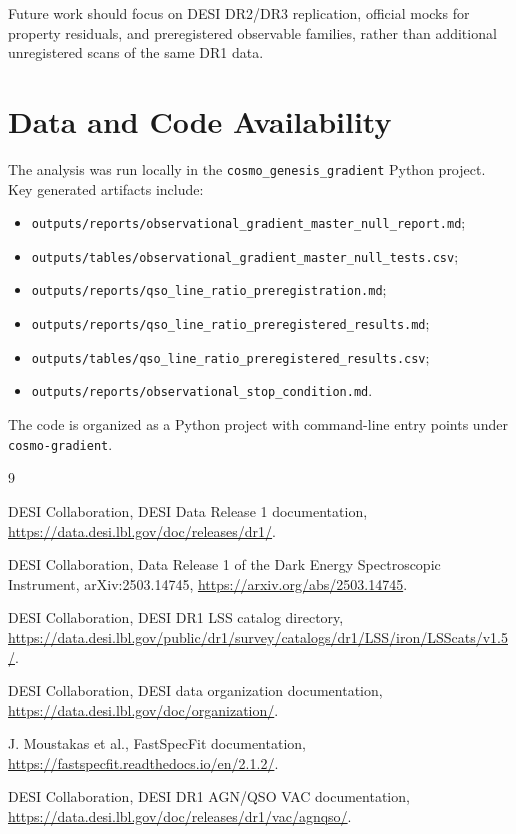 \documentclass[11pt]{article}
\begin{document}
Future work should focus on DESI DR2/DR3 replication, official mocks for property residuals, and preregistered observable families, rather than additional unregistered scans of the same DR1 data.

\section*{Data and Code Availability}

The analysis was run locally in the \texttt{cosmo\_genesis\_gradient} Python project. Key generated artifacts include:
\begin{itemize}
    \item \texttt{outputs/reports/observational\_gradient\_master\_null\_report.md};
    \item \texttt{outputs/tables/observational\_gradient\_master\_null\_tests.csv};
    \item \texttt{outputs/reports/qso\_line\_ratio\_preregistration.md};
    \item \texttt{outputs/reports/qso\_line\_ratio\_preregistered\_results.md};
    \item \texttt{outputs/tables/qso\_line\_ratio\_preregistered\_results.csv};
    \item \texttt{outputs/reports/observational\_stop\_condition.md}.
\end{itemize}

The code is organized as a Python project with command-line entry points under \texttt{cosmo-gradient}.

\begin{thebibliography}{9}

DESI Collaboration,
\newblock DESI Data Release 1 documentation,
\newblock \url{https://data.desi.lbl.gov/doc/releases/dr1/}.

DESI Collaboration,
\newblock Data Release 1 of the Dark Energy Spectroscopic Instrument,
\newblock arXiv:2503.14745,
\newblock \url{https://arxiv.org/abs/2503.14745}.

DESI Collaboration,
\newblock DESI DR1 LSS catalog directory,
\newblock \url{https://data.desi.lbl.gov/public/dr1/survey/catalogs/dr1/LSS/iron/LSScats/v1.5/}.

DESI Collaboration,
\newblock DESI data organization documentation,
\newblock \url{https://data.desi.lbl.gov/doc/organization/}.

J. Moustakas et al.,
\newblock FastSpecFit documentation,
\newblock \url{https://fastspecfit.readthedocs.io/en/2.1.2/}.

DESI Collaboration,
\newblock DESI DR1 AGN/QSO VAC documentation,
\newblock \url{https://data.desi.lbl.gov/doc/releases/dr1/vac/agnqso/}.

\end{thebibliography}
\end{document}
